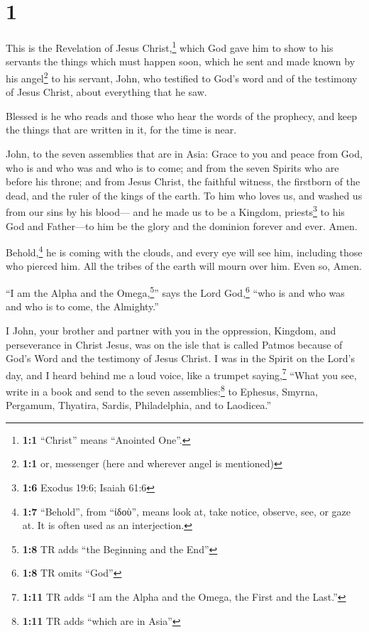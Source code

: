 \hypertarget{section}{%
\section{1}\label{section}}

 This is the Revelation of Jesus Christ,\footnote{\textbf{1:1}
  ``Christ'' means ``Anointed One''.} which God gave him to show to his
servants the things which must happen soon, which he sent and made known
by his angel\footnote{\textbf{1:1} or, messenger (here and wherever
  angel is mentioned)} to his servant, John,  who
testified to God's word and of the testimony of Jesus Christ, about
everything that he saw.

 Blessed is he who reads and those who hear the words of
the prophecy, and keep the things that are written in it, for the time
is near.

 John, to the seven assemblies that are in Asia: Grace to
you and peace from God, who is and who was and who is to come; and from
the seven Spirits who are before his throne;  and from
Jesus Christ, the faithful witness, the firstborn of the dead, and the
ruler of the kings of the earth. To him who loves us, and washed us from
our sins by his blood---  and he made us to be a Kingdom,
priests\footnote{\textbf{1:6} Exodus 19:6; Isaiah 61:6} to his God and
Father---to him be the glory and the dominion forever and ever. Amen.

 Behold,\footnote{\textbf{1:7} ``Behold'', from ``ἰδοὺ'',
  means look at, take notice, observe, see, or gaze at. It is often used
  as an interjection.} he is coming with the clouds, and every eye will
see him, including those who pierced him. All the tribes of the earth
will mourn over him. Even so, Amen.

 ``I am the Alpha and the Omega,\footnote{\textbf{1:8} TR
  adds ``the Beginning and the End''}'' says the Lord God,\footnote{\textbf{1:8}
  TR omits ``God''} ``who is and who was and who is to come, the
Almighty.''

 I John, your brother and partner with you in the
oppression, Kingdom, and perseverance in Christ Jesus, was on the isle
that is called Patmos because of God's Word and the testimony of Jesus
Christ.  I was in the Spirit on the Lord's day, and I
heard behind me a loud voice, like a trumpet 
saying,\footnote{\textbf{1:11} TR adds ``I am the Alpha and the Omega,
  the First and the Last.''} ``What you see, write in a book and send to
the seven assemblies:\footnote{\textbf{1:11} TR adds ``which are in
  Asia''} to Ephesus, Smyrna, Pergamum, Thyatira, Sardis, Philadelphia,
and to Laodicea.''

